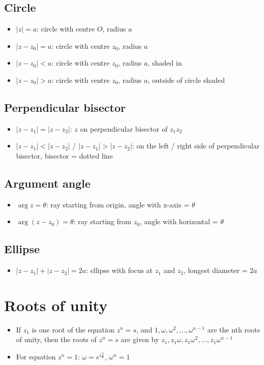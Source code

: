 \subsection{Circle}
\begin{itemize}
	\item $|z| = a$: circle with centre $O$, radius $a$
	\item $|z-z_0|=a$: circle with centre $z_0$, radius $a$
	\item $|z-z_0|<a$: circle with centre $z_0$, radius $a$, shaded in
	\item $|z-z_0|>a$: circle with centre $z_0$, radius $a$, outside of circle shaded
\end{itemize}
\subsection{Perpendicular bisector}
\begin{itemize}
	\item $|z-z_1|=|z-z_2|$: $z$ on perpendicular bisector of $z_1z_2$
	\item $|z-z_1|<|z-z_2|$ / $|z-z_1|>|z-z_2|$: on the left / right side of perpendicular bisector, bisector = dotted line
\end{itemize}
\subsection{Argument angle}
\begin{itemize}
	\item $\arg z = \theta$: ray starting from origin, angle with x-axis = $\theta$
	\item $\arg (z-z_0) = \theta$: ray starting from $z_0$, angle with horizontal = $\theta$
\end{itemize}
\subsection{Ellipse}
\begin{itemize}
	\item $|z-z_1|+|z-z_2|=2a$: ellipse with focus at $z_1$ and $z_2$, longest diameter = $2a$
\end{itemize}

\section{Roots of unity}
\begin{itemize}
	\item If $z_1$ is one root of the equation $z^n=s$, and $1,\omega,\omega^2,\dots,\omega^{n-1}$ are the nth roots of unity, then the roots of $z^n=s$ are given by $z_1, z_1\omega, z_1\omega^2, \dots, z_1\omega^{n-1}$
	\item For equation $z^n=1$: $\omega=e^{i\frac{\pi}{n}}$, $\omega^n=1$
\end{itemize}




